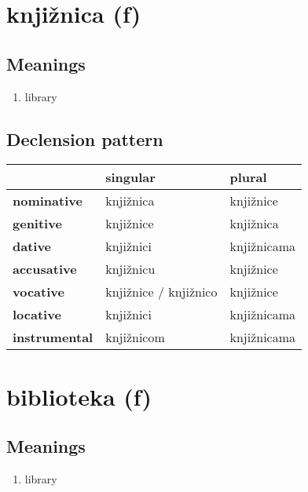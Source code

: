 \filbreak
\section{knjižnica (f)}
\subsection*{Meanings}
\begin{enumerate}
\item library
\end{enumerate}
\subsection*{Declension pattern}
\begin{tabularx}{\linewidth}{Xll}
\toprule
{} &               singular &       plural \\
\midrule
\textbf{nominative  } &              knjižnica &    knjižnice \\
\textbf{genitive    } &              knjižnice &    knjižnica \\
\textbf{dative      } &              knjižnici &  knjižnicama \\
\textbf{accusative  } &              knjižnicu &    knjižnice \\
\textbf{vocative    } &  knjižnice / knjižnico &    knjižnice \\
\textbf{locative    } &              knjižnici &  knjižnicama \\
\textbf{instrumental} &             knjižnicom &  knjižnicama \\
\bottomrule
\end{tabularx}

\filbreak
\section{biblioteka (f)}
\subsection*{Meanings}
\begin{enumerate}
\item library
\end{enumerate}
